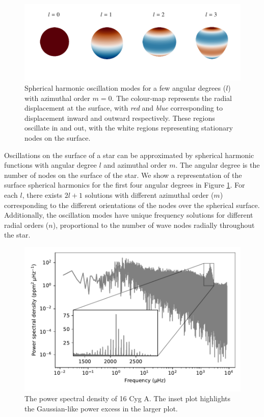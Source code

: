\begin{figure}[tb]
    \centering
    \includegraphics[trim={0 0.4in 0 0},clip]{figures/spherical_harmonics.pdf}
    \caption[Spherical harmonic oscillation modes for a few angular degrees ($l$) with azimuthal order \(m=0\).]{Spherical harmonic oscillation modes for a few angular degrees ($l$) with azimuthal order \(m=0\). The colour-map represents the radial displacement at the surface, with \emph{red} and \emph{blue} corresponding to displacement inward and outward respectively. These regions oscillate in and out, with the white regions representing stationary nodes on the surface.}
    \label{fig:spherical-harmonics}
\end{figure}

Oscillations on the surface of a star can be approximated by spherical harmonic functions with angular degree \(l\) and azimuthal order \(m\). The angular degree is the number of nodes on the surface of the star. We show a representation of the surface spherical harmonics for the first four angular degrees in Figure \ref{fig:spherical-harmonics}. For each \(l\), there exists \(2l+1\) solutions with different azimuthal order (\(m\)) corresponding to the different orientations of the nodes over the spherical surface. Additionally, the oscillation modes have unique frequency solutions for different radial orders (\(n\)), proportional to the number of wave nodes radially throughout the star.

\begin{figure}[tb]
    \centering
    \includegraphics{figures/seismo-psd.pdf}
    \caption[The power spectral density of 16 Cyg A.]{The power spectral density of 16 Cyg A. The inset plot highlights the Gaussian-like power excess in the larger plot.}
    \label{fig:seismo-psd}
\end{figure}

